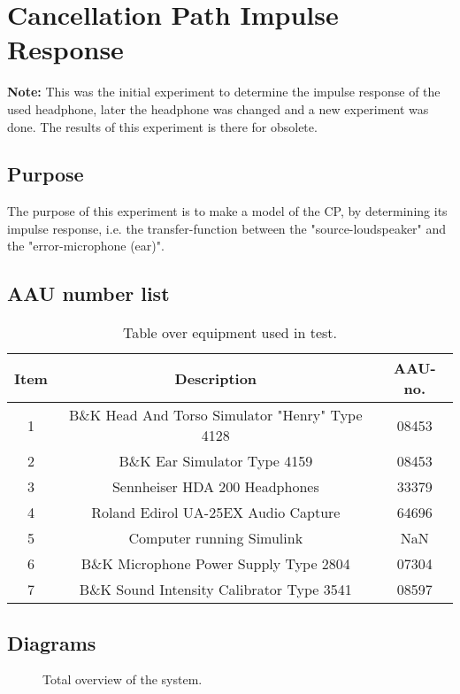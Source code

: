 \section{Cancellation Path Impulse Response} \label{sec:CPjournal}
\textbf{Note:} This was the initial experiment to determine the impulse response of the used headphone, later the headphone was changed and a new experiment was done. The results of this experiment is there for obsolete.

\subsection{Purpose}
The purpose of this experiment is to make a model of the CP, by determining its impulse response, i.e. the transfer-function between the "source-loudspeaker" and the "error-microphone (ear)".
		
\subsection{AAU number list}
\begin{table}[h]
	\centering
	\begin{tabular}{ c c c } \toprule
		{Item}	& {Description} 						& {AAU-no}. \\ \bottomrule 
		1	&	B\&K Head And Torso Simulator "Henry" Type 4128	& 08453		\\
		2	&	B\&K Ear Simulator Type 4159			& 08453		\\
		3	&	Sennheiser HDA 200	Headphones			& 33379		\\
		4	&	Roland Edirol UA-25EX Audio Capture		& 64696		\\
		5	&	Computer running Simulink\textsuperscript{\textregistered}					& NaN		\\
		6	&	B\&K Microphone Power Supply Type 2804 	& 07304		\\
		7	&	B\&K Sound Intensity Calibrator Type 3541	& 08597	\\ \bottomrule
	\end{tabular}
	\caption{Table over equipment used in test.}
	\label{tab:UsedEquipmentListningCP}
\end{table}

\subsection{Diagrams}
\begin{figure}[H]
	\centering
	
	\caption{Total overview of the system.}
	\label{SchematicOverviewCP}
\end{figure}

